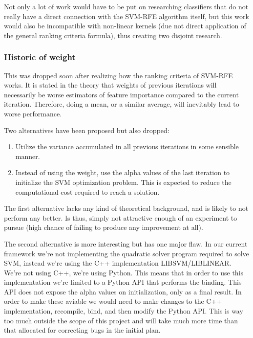 Not only a lot of work would have to be put on researching classifiers that do not really have a direct connection with the SVM-RFE algorithm itself, but this work would also be incompatible with non-linear kernels (due not direct application of the general ranking criteria formula), thus creating two disjoint research.

\subsubsection*{Historic of weight}
This was dropped soon after realizing how the ranking criteria of SVM-RFE works. It is stated in the theory that weights of previous iterations will necessarily be worse estimators of feature importance compared to the current iteration. Therefore, doing a mean, or a similar average, will inevitably lead to worse performance.

Two alternatives have been proposed but also dropped:

\begin{enumerate}
    \item Utilize the variance accumulated in all previous iterations in some sensible manner.
    \item Instead of using the weight, use the alpha values of the last iteration to init\-ialize the SVM optimization problem. This is expected to reduce the comput\-ational cost required to reach a solution.
\end{enumerate}

The first alternative lacks any kind of theoretical background, and is likely to not perform any better. Is thus, simply not attractive enough of an experiment to pursue (high chance of failing to produce any improvement at all).

The second alternative is more interesting but has one major flaw. In our current framework we're not implementing the quadratic solver program required to solve SVM, instead we're using the C++ implementation LIBSVM/LIBLINEAR. We're not using C++, we're using Python. This means that in order to use this implementation we're limited to a Python API that performs the binding. This API does not expose the alpha values on initialization, only as a final result. In order to make these aviable we would need to make changes to the C++ implementation, recompile, bind, and then modify the Python API. This is way too much outside the scope of this project and will take much more time than that allocated for correcting bugs in the initial plan.

